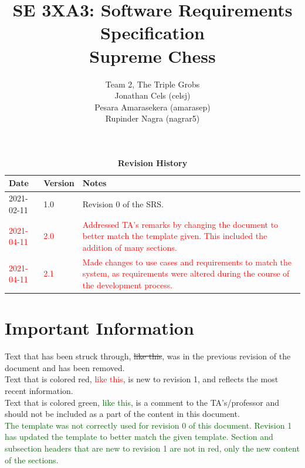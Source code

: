 \documentclass[12pt, titlepage]{article}
\title{SE 3XA3: Software Requirements Specification\\Supreme Chess}
\author{Team 2, The Triple Grobs
        \\ Jonathan Cels (celsj)
        \\ Pesara Amarasekera (amarasep)
        \\ Rupinder Nagra (nagrar5)
}
\begin{document}
\maketitle

\tableofcontents
\listoftables
\listoffigures

\begin{table}[h]
    \caption{\bf Revision History}
    \begin{tabularx}{\textwidth}{p{3cm}p{2cm}X}
        \toprule {\bf Date} & {\bf Version} & {\bf Notes}\\
        \midrule
        2021-02-11 & 1.0 & Revision 0 of the SRS.\\
        \hline
        \textcolor{red}{2021-04-11} & \textcolor{red}{2.0} & \textcolor{red}{Addressed TA's remarks by changing the document to better match the template given. This included the addition of many sections.}\\
        \hline
        \textcolor{red}{2021-04-11} & \textcolor{red}{2.1} & \textcolor{red}{Made changes to use cases and requirements to match the system, as requirements were altered during the course of the development process.}\\
        \bottomrule
    \end{tabularx}
\end{table}

\newpage


\section*{Important Information}
    Text that has been struck through, \sout{like this}, was in the previous revision of the document and has been removed. \\
    
    Text that is colored red, \textcolor{red}{like this}, is new to revision 1, and reflects the most recent information. \\
    
    Text that is colored green, \textcolor{darkgreen}{like this}, is a comment to the TA's/professor and should not be included as a part of the content in this document. \\

    \textcolor{darkgreen}{The template was not correctly used for revision 0 of this document. Revision 1 has updated the template to better match the given template. Section and subsection headers that are new to revision 1 are not in red, only the new content of the sections.}\\
    
\end{document}
